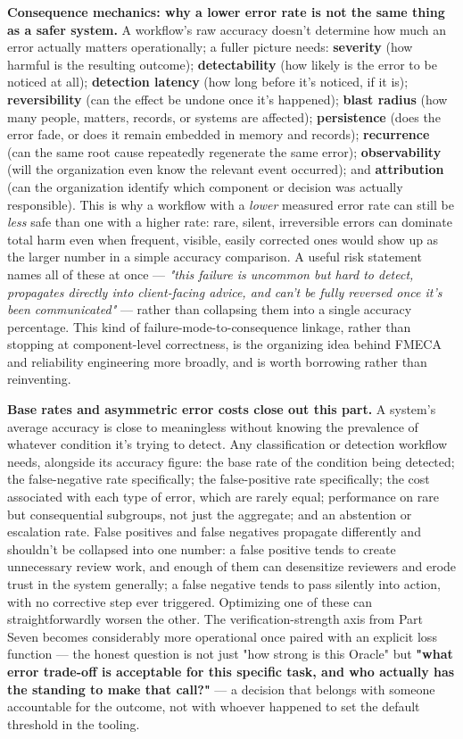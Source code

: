 \textbf{Consequence mechanics: why a lower error rate is not the same thing as a safer system.} A workflow's raw accuracy doesn't determine how much an error actually matters operationally; a fuller picture needs: \textbf{severity} (how harmful is the resulting outcome); \textbf{detectability} (how likely is the error to be noticed at all); \textbf{detection latency} (how long before it's noticed, if it is); \textbf{reversibility} (can the effect be undone once it's happened); \textbf{blast radius} (how many people, matters, records, or systems are affected); \textbf{persistence} (does the error fade, or does it remain embedded in memory and records); \textbf{recurrence} (can the same root cause repeatedly regenerate the same error); \textbf{observability} (will the organization even know the relevant event occurred); and \textbf{attribution} (can the organization identify which component or decision was actually responsible). This is why a workflow with a \emph{lower} measured error rate can still be \emph{less} safe than one with a higher rate: rare, silent, irreversible errors can dominate total harm even when frequent, visible, easily corrected ones would show up as the larger number in a simple accuracy comparison. A useful risk statement names all of these at once --- \emph{"this failure is uncommon but hard to detect, propagates directly into client-facing advice, and can't be fully reversed once it's been communicated"} --- rather than collapsing them into a single accuracy percentage. This kind of failure-mode-to-consequence linkage, rather than stopping at component-level correctness, is the organizing idea behind FMECA and reliability engineering more broadly, and is worth borrowing rather than reinventing.

\textbf{Base rates and asymmetric error costs close out this part.} A system's average accuracy is close to meaningless without knowing the prevalence of whatever condition it's trying to detect. Any classification or detection workflow needs, alongside its accuracy figure: the base rate of the condition being detected; the false-negative rate specifically; the false-positive rate specifically; the cost associated with each type of error, which are rarely equal; performance on rare but consequential subgroups, not just the aggregate; and an abstention or escalation rate. False positives and false negatives propagate differently and shouldn't be collapsed into one number: a false positive tends to create unnecessary review work, and enough of them can desensitize reviewers and erode trust in the system generally; a false negative tends to pass silently into action, with no corrective step ever triggered. Optimizing one of these can straightforwardly worsen the other. The verification-strength axis from Part Seven becomes considerably more operational once paired with an explicit loss function --- the honest question is not just "how strong is this Oracle" but \textbf{"what error trade-off is acceptable for this specific task, and who actually has the standing to make that call?"} --- a decision that belongs with someone accountable for the outcome, not with whoever happened to set the default threshold in the tooling.
